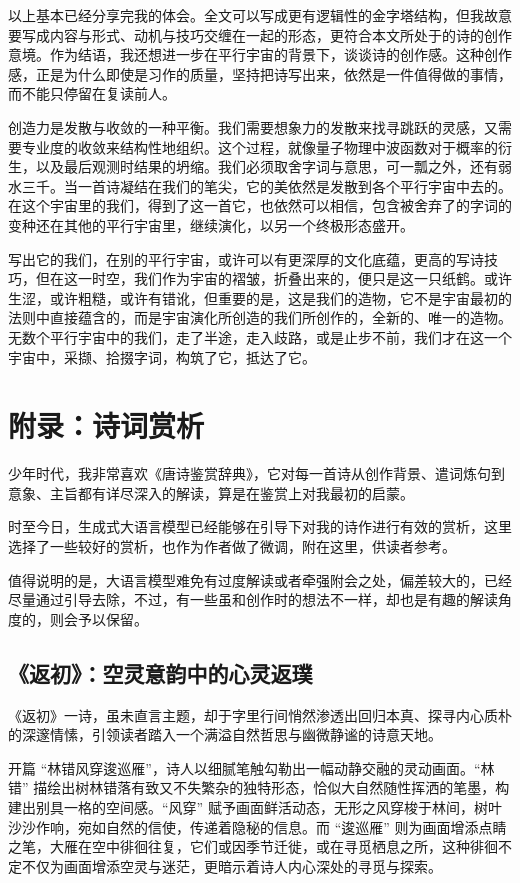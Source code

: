 \documentclass{article}
\begin{document}
以上基本已经分享完我的体会。全文可以写成更有逻辑性的金字塔结构，但我故意要写成内容与形式、动机与技巧交缠在一起的形态，更符合本文所处于的诗的创作意境。作为结语，我还想进一步在平行宇宙的背景下，谈谈诗的创作感。这种创作感，正是为什么即使是习作的质量，坚持把诗写出来，依然是一件值得做的事情，而不能只停留在复读前人。

创造力是发散与收敛的一种平衡。我们需要想象力的发散来找寻跳跃的灵感，又需要专业度的收敛来结构性地组织。这个过程，就像量子物理中波函数对于概率的衍生，以及最后观测时结果的坍缩。我们必须取舍字词与意思，可一瓢之外，还有弱水三千。当一首诗凝结在我们的笔尖，它的美依然是发散到各个平行宇宙中去的。在这个宇宙里的我们，得到了这一首它，也依然可以相信，包含被舍弃了的字词的变种还在其他的平行宇宙里，继续演化，以另一个终极形态盛开。

写出它的我们，在别的平行宇宙，或许可以有更深厚的文化底蕴，更高的写诗技巧，但在这一时空，我们作为宇宙的褶皱，折叠出来的，便只是这一只纸鹤。或许生涩，或许粗糙，或许有错讹，但重要的是，这是我们的造物，它不是宇宙最初的法则中直接蕴含的，而是宇宙演化所创造的我们所创作的，全新的、唯一的造物。无数个平行宇宙中的我们，走了半途，走入歧路，或是止步不前，我们才在这一个宇宙中，采撷、拾掇字词，构筑了它，抵达了它。

\section{附录：诗词赏析}

少年时代，我非常喜欢《唐诗鉴赏辞典》，它对每一首诗从创作背景、遣词炼句到意象、主旨都有详尽深入的解读，算是在鉴赏上对我最初的启蒙。

时至今日，生成式大语言模型已经能够在引导下对我的诗作进行有效的赏析，这里选择了一些较好的赏析，也作为作者做了微调，附在这里，供读者参考。

值得说明的是，大语言模型难免有过度解读或者牵强附会之处，偏差较大的，已经尽量通过引导去除，不过，有一些虽和创作时的想法不一样，却也是有趣的解读角度的，则会予以保留。

\subsection{《返初》：空灵意韵中的心灵返璞}\label{sec:fan-chu}

《返初》一诗，虽未直言主题，却于字里行间悄然渗透出回归本真、探寻内心质朴的深邃情愫，引领读者踏入一个满溢自然哲思与幽微静谧的诗意天地。

开篇 “林错风穿逡巡雁”，诗人以细腻笔触勾勒出一幅动静交融的灵动画面。“林错” 描绘出树林错落有致又不失繁杂的独特形态，恰似大自然随性挥洒的笔墨，构建出别具一格的空间感。“风穿” 赋予画面鲜活动态，无形之风穿梭于林间，树叶沙沙作响，宛如自然的信使，传递着隐秘的信息。而 “逡巡雁” 则为画面增添点睛之笔，大雁在空中徘徊往复，它们或因季节迁徙，或在寻觅栖息之所，这种徘徊不定不仅为画面增添空灵与迷茫，更暗示着诗人内心深处的寻觅与探索。
\end{document}
